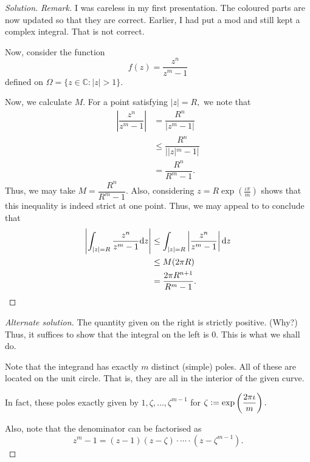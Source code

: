 \documentclass[12pt]{article}
\theoremstyle{definition}
\newenvironment{soln}{\begin{proof}[Solution]}{\end{proof}}
\begin{document}
\begin{enumerate}
\begin{soln}
		{\color{myupdatecolor}\emph{Remark.} I was careless in my first presentation. The coloured parts are now updated so that they are correct. Earlier, I had put a mod and still kept a complex integral. That is not correct.}

		Now, consider the function
		\begin{equation*} 
			f(z) = \dfrac{z^n}{z^m - 1}
		\end{equation*}
		defined on $\Omega = \{z \in \mathbb{C} : |z| > 1\}.$

		Now, we calculate $M.$ For a point satisfying $|z| = R,$ we note that
		\begin{align*} 
			\left|\dfrac{z^n}{z^m - 1}\right| &= \dfrac{R^n}{|z^m - 1|}\\
			&\le \dfrac{R^n}{||z|^m - 1|}\\
			&= \dfrac{R^n}{R^m - 1}.
		\end{align*}
		Thus, we may take $M = \dfrac{R^n}{R^m - 1}.$ Also, considering $z = R\exp\left(\frac{\iota\pi}{m}\right)$ shows that this inequality is indeed strict at one point. Thus, we may appeal to  to conclude that
		\begin{align*} 
			\left|\int_{|z| = R}^{} \dfrac{z^n}{z^m - 1} {\mathrm{d}}z\right| &\le \int_{|z| = R}^{} \left|\dfrac{z^n}{z^m - 1}\right| {\mathrm{d}}z\\
			&\le M(2\pi R)\\
			&= \dfrac{2\pi R^{n + 1}}{R^{m} - 1}. \qedhere
		\end{align*}
	\end{soln}

	\begin{proof}[Alternate solution]
		The quantity given on the right is strictly positive. (Why?)\\
		Thus, it suffices to show that the integral on the left is $0.$ This is what we shall do.

		Note that the integrand has exactly $m$ distinct (simple) poles. All of these are located on the unit circle. That is, they are all in the interior of the given curve.

		In fact, these poles exactly given by $1, \zeta, \ldots, \zeta^{m-1}$ for $\zeta\vcentcolon=\exp\left(\dfrac{2\pi\iota}{m}\right).$

		Also, note that the denominator can be factorised as
		\begin{equation*} 
			z^m - 1 = (z - 1)(z - \zeta)\cdot\cdots\cdot(z - \zeta^{m-1}).
		\end{equation*}


\end{proof}
\end{enumerate}
\end{document}
